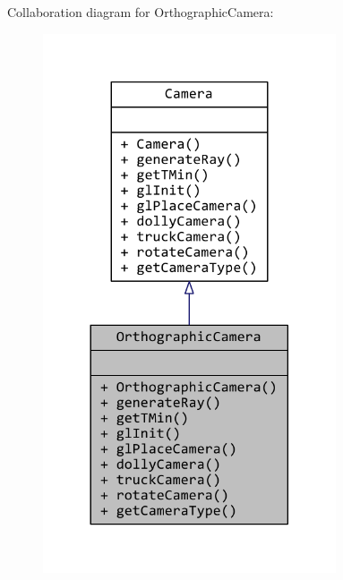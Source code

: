 Collaboration diagram for Orthographic\+Camera\+:
\nopagebreak
\begin{figure}[H]
\begin{center}
\leavevmode
\includegraphics[width=245pt]{classOrthographicCamera__coll__graph}
\end{center}
\end{figure}
